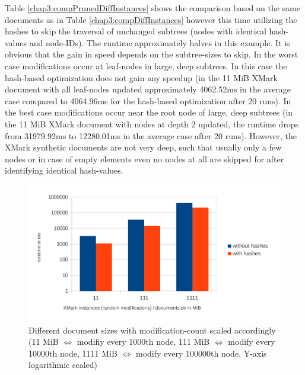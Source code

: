 Table \ref{chap3:compPrunedDiffInstances} shows the comparison based on the same documents as in Table \ref{chap3:compDiffInstances} however this time utilizing the hashes to skip the traversal of unchanged subtrees (nodes with identical hash-values and node-IDs). The runtime approximately halves in this example. It is obvious that the gain in speed depends on the subtree-sizes to skip. In the worst case modifications occur at leaf-nodes in large, deep subtrees. In this case the hash-based optimization does not gain any speedup (in the 11 MiB XMark document with all leaf-nodes updated approximately 4062.52ms in the average case compared to 4064.96ms for the hash-based optimization after 20 runs). In the best case modifications occur near the root node of large, deep subtrees (in the 11 MiB XMark document with nodes at depth 2 updated, the runtime drops from 31979.92ms to 12280.01ms in the average case after 20 runs). However, the XMark synthetic documents are not very deep, such that usually only a few nodes or in case of empty elements even no nodes at all are skipped for after identifying identical hash-values.

\begin{figure}[tb]
\centering
\includegraphics[width=\textwidth]{figures/diff-docsize-scale-pruned}
\caption{Different document sizes with modification-count scaled accordingly (11 MiB $\Leftrightarrow$ modifiy every 1000th node, 111 MiB $\Leftrightarrow$ modify every 10000th node, 1111 MiB $\Leftrightarrow$ modify every 100000th node. Y-axis logarithmic scaled)} 
\label{fig:docScaling}
\end{figure}

